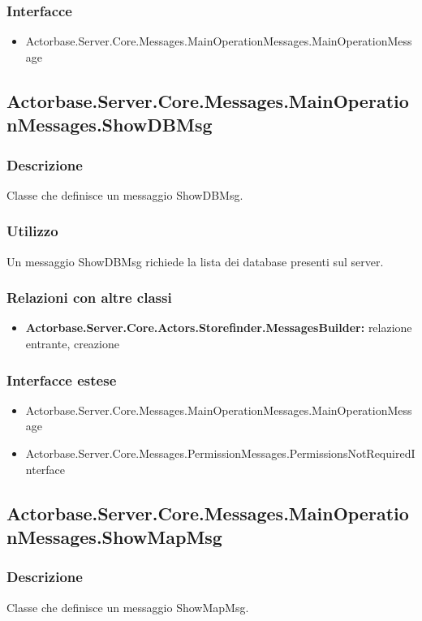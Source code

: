 \documentclass[a4paper]{article}
\begin{document}
			\subsubsection{Interfacce}
			\begin{itemize}
				\item Actorbase.Server.Core.Messages.MainOperationMessages.MainOperationMessage
			\end{itemize}

			\subsection{Actorbase.Server.Core.Messages.MainOperationMessages.ShowDBMsg}
			\subsubsection{Descrizione}
				Classe che definisce un messaggio ShowDBMsg.
			\subsubsection{Utilizzo}
				Un messaggio ShowDBMsg richiede la lista dei database presenti sul server.
			\subsubsection{Relazioni con altre classi}
			\begin{itemize}
				\item \textbf{Actorbase.Server.Core.Actors.Storefinder.MessagesBuilder:} relazione entrante, creazione
			\end{itemize}
			\subsubsection{Interfacce estese}
			\begin{itemize}
				\item Actorbase.Server.Core.Messages.MainOperationMessages.MainOperationMessage
				\item Actorbase.Server.Core.Messages.PermissionMessages.PermissionsNotRequiredInterface
			\end{itemize}

			\subsection{Actorbase.Server.Core.Messages.MainOperationMessages.ShowMapMsg}
			\subsubsection{Descrizione}
				Classe che definisce un messaggio ShowMapMsg.
\end{document}
